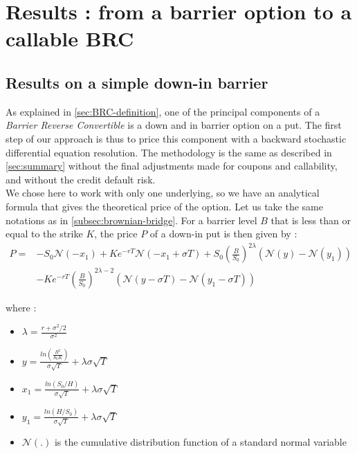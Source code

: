 \documentclass[a4paper,11pt,english]{book}
\begin{document}

\chapter{Results : from a barrier option to a callable BRC}

\section{Results on a simple down-in barrier}
As explained in \ref{sec:BRC-definition}, one of the principal components of a \textit{Barrier Reverse Convertible} is a down and in barrier option on a put. The first step of our approach is thus to price this component with a backward stochastic differential equation resolution. The methodology is the same as described in \ref{sec:summary} without the final adjustments made for coupons and callability, and without the credit default risk.\\

We chose here to work with only one underlying, so we have an analytical formula that gives the theoretical price of the option. Let us take the same notations as in \ref{subsec:brownian-bridge}. For a barrier level $B$ that is less than or equal to the strike $K$, the price $P$ of a down-in put is then given by \cite{hull2016options}: 
$$\begin{align}
P =& -S_{0}\mathcal{N}(-x_{1})+Ke^{-rT}\mathcal{N}(-x_{1}+\sigma T)+S_{0}(\frac{B}{S_{0}})^{2\lambda}(\mathcal{N}(y)-\mathcal{N}(y_{1})) \\
&-Ke^{-rT}(\frac{B}{S_{0}})^{2\lambda-2}(\mathcal{N}(y-\sigma T)-\mathcal{N}(y_{1}-\sigma T))
\end{align}$$

where :
\begin{itemize}
    \item $\lambda=\frac{r+\sigma^{2}/2}{\sigma^{2}}$
    \item $y=\frac{ln(\frac{B^{2}}{S_{0}K})}{\sigma \sqrt{T}}+\lambda \sigma \sqrt{T}$
    \item $x_{1}=\frac{ln(S_{0}/H)}{\sigma \sqrt{T}}+\lambda \sigma \sqrt{T}$
    \item $y_{1}=\frac{ln(H/S_{0})}{\sigma \sqrt{T}}+\lambda \sigma \sqrt{T}$
    \item $\mathcal{N}(.)$ is the cumulative distribution function of a standard normal variable
\end{itemize}
\end{document}
